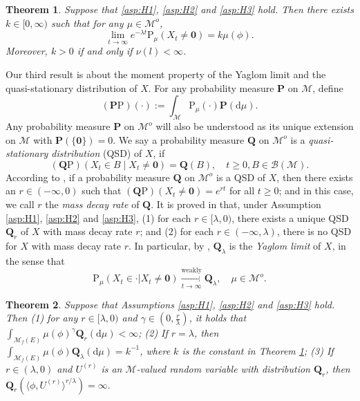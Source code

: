 \documentclass[12pt,a4paper]{amsart}
\numberwithin{equation}{section}
\theoremstyle{plain}
\newtheorem{thm}{Theorem}[section]
\theoremstyle{definition}
\theoremstyle{remark}
\begin{document}
\begin{thm} \label{thm:E}
	Suppose that \eqref{asp:H1}, \eqref{asp:H2} and \eqref{asp:H3} hold.	
	Then there exists $k\in [0,\infty)$ such that for any $\mu \in \mathcal M^o$,
\begin{equation}\label{eq:M.4}
	\lim_{t\rightarrow\infty} e^{-\lambda t}\mathrm P_\mu(X_t \neq \mathbf 0)
	=k\mu(\phi).
\end{equation}
	Moreover, $k>0$ if and only if $\nu(l)<\infty$.
\end{thm}

	Our third result is about the moment property of the Yaglom limit and the quasi-stationary distribution of $X$.
	For any probability measure $\mathbf P$ on $\mathcal M$, define
\[
	(\mathbf P\mathrm P)(\cdot)
	:= \int_{\mathcal M} \mathrm P_\mu(\cdot)\mathbf P({\mathrm d}\mu).
\]
	Any probability measure $\mathbf P$ on $\mathcal M^o$ will also be understood as its unique extension on $\mathcal M$ with  $\mathbf P(\{\mathbf 0\}) = 0$.
 We say a probability measure $\mathbf Q$ on $\mathcal M^o$ is a \emph{quasi-stationary distribution} (QSD) of $X$, if
\[
	(\mathbf Q \mathrm P) \left( X_t \in B \middle | X_t \neq \mathbf 0 \right)
	= \mathbf Q(B),
	\quad t\geq 0, B \in \mathscr B(\mathcal M).
\]
	According to \cite[(1.4)]{LiuRenSongSun2020}, 
	if a probability measure $\mathbf Q$ on $\mathcal M^o$ is a QSD of $X$, then there exists an $r\in (-\infty, 0)$ such that $(\mathbf Q\mathrm P)(X_t \neq \mathbf 0) = e^{rt}$ for all $t\geq 0$; and in this case, we call $r$ the \emph{mass decay rate} of $\mathbf Q$.
	It is proved in \cite[Theorem 1.2]{LiuRenSongSun2020} that, under Assumption \eqref{asp:H1}, \eqref{asp:H2} and \eqref{asp:H3},
	(1) for each $r\in [\lambda, 0)$, there exists a unique QSD $\mathbf Q_r$ of $X$ with mass decay rate $r$;
	and (2) for each $r\in (-\infty, \lambda)$, there is no QSD for $X$ with mass decay rate $r$.
	In particular, 
	by \cite[Theorem 1.1, Proposition 2.5]{LiuRenSongSun2020}, 
	$\mathbf Q_\lambda$ is the \emph{Yaglom limit} of $X$, in the sense that
\begin{equation}
	\mathrm P_\mu(X_t \in \cdot | X_t \neq \mathbf 0)
	\xrightarrow[t\to \infty]{\text{weakly}} \mathbf Q_\lambda,
	\quad \mu \in \mathcal M^o.
\end{equation}

\begin{thm}\label{thm:L}
	Suppose that Assumptions \eqref{asp:H1}, \eqref{asp:H2} and \eqref{asp:H3} hold.
	Then (1)
	for any $r\in [\lambda, 0)$ and $\gamma \in (0, \frac{r}{\lambda})$, it holds that $\int_{{\mathcal M}_f(E)}\mu(\phi)^\gamma\mathbf Q_r({\mathrm d}\mu)<\infty$;
	(2) 
	If $r=\lambda$,
	then $\int_{{\mathcal M}_f(E)}\mu(\phi)\mathbf Q_\lambda({\mathrm d}\mu) = k^{-1}$, where $k$ is  the constant in Theorem \ref{thm:E};
	(3) 
	If $r\in (\lambda, 0)$ %
	and $U^{(r)}$ is an $\mathcal M$-valued random variable with distribution $ \mathbf Q_r$, then $ \mathbf Q_r(\langle\phi, U^{(r)}\rangle^{r/\lambda})=\infty.$
\end{thm}
\end{document}
